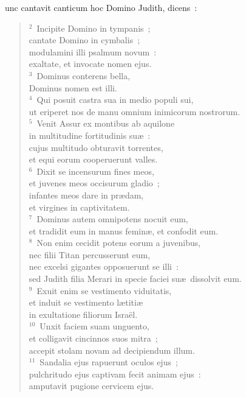 \bchapter
{}unc cantavit canticum hoc Domino Judith, dicens~:
\begin{flushleft}\begin{verse}\vspace{6pt}${}^{2}$~Incipite Domino in tympanis~;\\ cantate Domino in cymbalis~;\\ modulamini illi psalmum novum~:\\ exaltate, et invocate nomen ejus.\\
${}^{3}$~Dominus conterens bella,\\ Dominus nomen est illi.\\
${}^{4}$~Qui posuit castra sua in medio populi sui,\\ ut eriperet nos de manu omnium inimicorum nostrorum.\\
${}^{5}$~Venit Assur ex montibus ab aquilone\\ in multitudine fortitudinis su\ae~:\\ cujus multitudo obturavit torrentes,\\ et equi eorum cooperuerunt valles.\\
${}^{6}$~Dixit se incensurum fines meos,\\ et juvenes meos occisurum gladio~;\\ infantes meos dare in pr\ae dam,\\ et virgines in captivitatem.\\
${}^{7}$~Dominus autem omnipotens nocuit eum,\\ et tradidit eum in manus femin\ae , et confodit eum.\\
${}^{8}$~Non enim cecidit potens eorum a juvenibus,\\ nec filii Titan percusserunt eum,\\ nec excelsi gigantes opposuerunt se illi~:\\ sed Judith filia Merari in specie faciei su\ae\ dissolvit eum.\\
${}^{9}$~Exuit enim se vestimento viduitatis,\\ et induit se vestimento l\ae titi\ae \\ in exultatione filiorum Isra\"el.\\
${}^{10}$~Unxit faciem suam unguento,\\ et colligavit cincinnos suos mitra~;\\ accepit stolam novam ad decipiendum illum.\\
${}^{11}$~Sandalia ejus rapuerunt oculos ejus~;\\ pulchritudo ejus captivam fecit animam ejus~:\\ amputavit pugione cervicem ejus.\\

\end{verse}
\end{flushleft}
